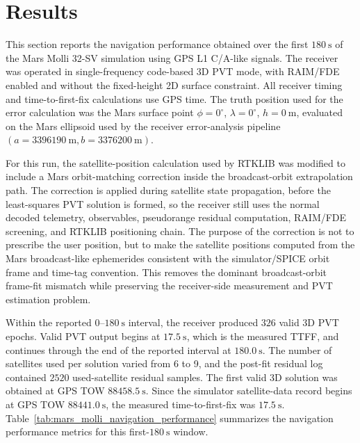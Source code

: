 \section{Results}
\label{sec:mars_molli_results}

This section reports the navigation performance obtained over the first
\(180~\mathrm{s}\) of the Mars Molli 32-SV simulation using GPS L1 C/A-like signals.
The receiver was operated in single-frequency code-based 3D PVT mode, with RAIM/FDE
enabled and without the fixed-height 2D surface constraint. All receiver timing and
time-to-first-fix calculations use GPS time. The truth position used for the error
calculation was the Mars surface point \(\phi = 0^\circ\), \(\lambda = 0^\circ\),
\(h = 0~\mathrm{m}\), evaluated on the Mars ellipsoid used by the receiver
error-analysis pipeline \((a = 3396190~\mathrm{m}, b = 3376200~\mathrm{m})\).

For this run, the satellite-position calculation used by RTKLIB was modified to
include a Mars orbit-matching correction inside the broadcast-orbit extrapolation
path. The correction is applied during satellite state propagation, before the
least-squares PVT solution is formed, so the receiver still uses the normal decoded
telemetry, observables, pseudorange residual computation, RAIM/FDE screening, and
RTKLIB positioning chain. The purpose of the correction is not to prescribe the user
position, but to make the satellite positions computed from the Mars broadcast-like
ephemerides consistent with the simulator/SPICE orbit frame and time-tag convention.
This removes the dominant broadcast-orbit frame-fit mismatch while preserving the
receiver-side measurement and PVT estimation problem.

Within the reported \(0\)--\(180~\mathrm{s}\) interval, the receiver produced
\(326\) valid 3D PVT epochs. Valid PVT output begins at \(17.5~\mathrm{s}\), which is
the measured TTFF, and continues through the end of the reported interval at
\(180.0~\mathrm{s}\). The number of satellites used per solution varied from 6 to 9,
and the post-fit residual log contained \(2520\) used-satellite residual samples.
The first valid 3D solution was obtained at GPS TOW \(88458.5~\mathrm{s}\). Since the
simulator satellite-data record begins at GPS TOW \(88441.0~\mathrm{s}\), the
measured time-to-first-fix was \(17.5~\mathrm{s}\).
Table~\ref{tab:mars_molli_navigation_performance} summarizes the navigation
performance metrics for this first-\(180~\mathrm{s}\) window.

